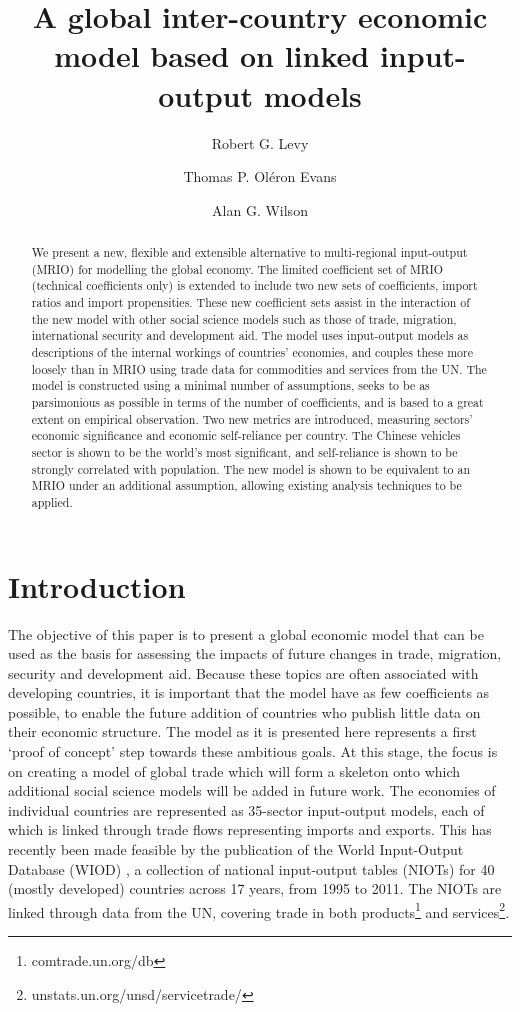 \documentclass[a4paper]{article}
\title{A global inter-country economic model based on linked input-output models}
\author[*]{Robert G. Levy}
\author[**]{Thomas P. Ol\'{e}ron Evans}
\author[*]{Alan G. Wilson}
\affil[*]{Centre for Advanced Spatial Analysis, UCL Bartlett Faculty of the Built Environment,
90 Tottenham Court Road, London W1T 4TJ, UK}
\affil[**]{Department of Mathematics, University College London, Gower Street, London WC1E 6BT, UK}
\begin{document}
\maketitle

\begin{abstract}
We present a new, flexible and extensible alternative to multi-regional input-output (MRIO) for modelling the global economy.
The limited coefficient set of MRIO (technical coefficients only) is extended to include two new sets of coefficients, import ratios and import propensities.
These new coefficient sets assist in the interaction of the new model with other social science models such as those of trade, migration, international security and development aid.
The model uses input-output models as descriptions of the internal workings of countries' economies, and couples these more loosely than in MRIO using trade data for commodities and services from the UN.
The model is constructed using a minimal number of assumptions, seeks to be as parsimonious as possible in terms of the number of coefficients, and is based to a great extent on empirical observation.
Two new metrics are introduced, measuring sectors' economic significance and economic self-reliance per country.
The Chinese vehicles sector is shown to be the world's most significant, and self-reliance is shown to be strongly correlated with population.
The new model is shown to be equivalent to an MRIO under an additional assumption, allowing existing analysis techniques to be applied.
\end{abstract}

\section{Introduction}
The objective of this paper is to present a global economic model that can be used as the basis for assessing the impacts of future changes in trade, migration, security and development aid.
Because these topics are often associated with developing countries, it is important that the model have as few coefficients as possible, to enable the future addition of countries who publish little data on their economic structure.
The model as it is presented here represents a first `proof of concept' step towards these ambitious goals.
At this stage, the focus is on creating a model of global trade which will form a skeleton onto which additional social science models will be added in future work.
The economies of individual countries are represented as 35-sector input-output models, each of which is linked through trade flows representing imports and exports.
This has recently been made feasible by the publication of the World Input-Output Database (WIOD) \parencite{timmer_world_2012}, a collection of national input-output tables (NIOTs) for 40 (mostly developed) countries across 17 years, from 1995 to 2011.
The NIOTs are linked through data from the UN, covering trade in both products\footnote{comtrade.un.org/db} and services\footnote{unstats.un.org/unsd/servicetrade/}.
\end{document}
